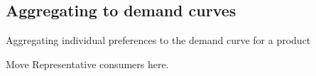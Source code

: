 
\subsection{Aggregating to demand curves}

Aggregating individual preferences to the demand curve for a product

Move Representative consumers here.

